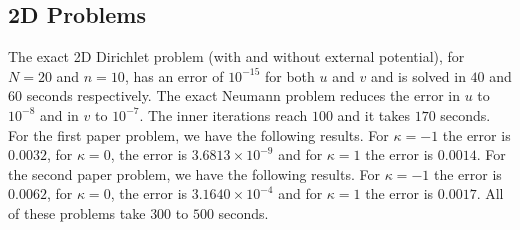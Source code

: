 \documentclass[11pt, a4paper]{article}
\theoremstyle{definition}
\begin{document}
\subsection{2D Problems}
The exact 2D Dirichlet problem (with and without external potential), for $N = 20$ and $n = 10$, has an error of $10^{-15}$ for both $u$ and $v$ and is solved in $40$ and $60$ seconds respectively. The exact Neumann problem reduces the error in $u$ to $10^{-8}$ and in $v$ to $10^{-7}$. The inner iterations reach $100$ and it takes $170$ seconds.
For the first paper problem, we have the following results. For $\kappa = -1$ the error is $0.0032$, for $\kappa = 0$, the error is $3.6813 \times 10^{-9}$ and for $\kappa = 1$ the error is $0.0014$.
For the second paper problem, we have the following results. For $\kappa = -1$ the error is $0.0062$, for $\kappa = 0$, the error is $3.1640 \times 10^{-4}$ and for $\kappa = 1$ the error is $0.0017$.
All of these problems take $300$ to $500$ seconds.
\end{document}
